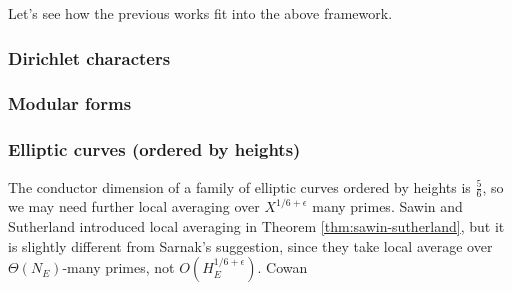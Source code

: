 Let's see how the previous works \cite{zubrilina2023murmurations,lee2025murmurations,sawin2025murmurations} fit into the above framework.

\subsubsection{Dirichlet characters}

\subsubsection{Modular forms}


\subsubsection{Elliptic curves (ordered by heights)}

The conductor dimension of a family of elliptic curves ordered by heights is $\frac{5}{6}$, so we may need further local averaging over $X^{1/6 + \epsilon}$ many primes.
Sawin and Sutherland introduced local averaging in Theorem \ref{thm:sawin-sutherland}, but it is slightly different from Sarnak's suggestion, since they take local average over $\Theta(N_E)$-many primes, not $O(H_E^{1/6 + \epsilon})$.
\ber Cowan \cite{cowan2024murmurations}\er